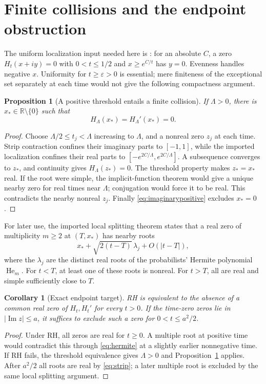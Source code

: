 \documentclass[11pt]{article}
\numberwithin{equation}{section}
\newtheorem{proposition}[theorem]{Proposition}
\newtheorem{corollary}[theorem]{Corollary}
\theoremstyle{definition}
\theoremstyle{remark}
\DeclareMathOperator{\Ima}{Im}
\begin{document}
\section{Finite collisions and the endpoint obstruction}
\label{sec:collisions}
The uniform localization input needed here is
\cite[Theorem~1.5(i)]{polymath}: for an absolute $C$, a zero
$H_t(x+iy)=0$ with $0<t\le1/2$ and $x\ge e^{C/t}$ has $y=0$.
Evenness handles negative $x$. Uniformity for $t\ge\varepsilon>0$ is
essential; mere finiteness of the exceptional set separately at each
time would not give the following compactness argument.

\begin{proposition}[A positive threshold entails a finite collision]
\label{prop:finitecollision}
If $\Lambda>0$, there is $x_*\in\mathbb R\setminus\{0\}$ such that
\begin{equation}\label{eq:collision}
 H_\Lambda(x_*)=H_\Lambda'(x_*)=0.
\end{equation}
\end{proposition}
\begin{proof}
Choose $\Lambda/2\le t_j<\Lambda$ increasing to $\Lambda$, and a
nonreal zero $z_j$ at each time. Strip contraction confines their imaginary
parts to $[-1,1]$, while the imported localization confines their real
parts to $[-e^{2C/\Lambda},e^{2C/\Lambda}]$. A subsequence converges
to $z_*$, and continuity gives $H_\Lambda(z_*)=0$. The threshold property
makes $z_*=x_*$ real. If the root were simple, the implicit-function
theorem would give a unique nearby zero for real times near $\Lambda$;
conjugation would force it to be real. This contradicts the nearby
nonreal $z_j$. Finally \eqref{eq:imaginarypositive} excludes $x_*=0$.
\end{proof}

For later use, the imported local splitting theorem
\cite[Proposition~3.1]{polymath} states that a real zero of multiplicity
$m\ge2$ at $(T,x_*)$ has nearby roots
\begin{equation}\label{eq:hermite}
 x_*+\sqrt{2(t-T)}\,\lambda_j+O(|t-T|),
\end{equation}
where the $\lambda_j$ are the distinct real roots of the probabilists'
Hermite polynomial $\operatorname{He}_m$. For $t<T$, at least one of
these roots is nonreal. For $t>T$, all are real and simple sufficiently
close to $T$.

\begin{corollary}[Exact endpoint target]\label{cor:rhcollision}
RH is equivalent to the absence of a common real zero of $H_t,H_t'$ for
every $t>0$. If the time-zero zeros lie in $|\Ima z|\le a$, it suffices
to exclude such a zero for $0<t\le a^2/2$.
\end{corollary}
\begin{proof}
Under RH, all zeros are real for $t\ge0$. A multiple root at positive
time would contradict this through \eqref{eq:hermite} at a slightly
earlier nonnegative time. If RH fails, the threshold equivalence gives
$\Lambda>0$ and Proposition~\ref{prop:finitecollision} applies.
After $a^2/2$ all roots are real by \eqref{eq:strip}; a later multiple
root is excluded by the same local splitting argument.
\end{proof}
\end{document}
